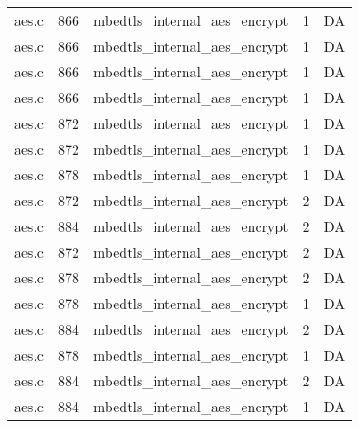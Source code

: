 \begin{table}
\begin{tabular}{clrrr}
aes.c& 866&mbedtls\_internal\_aes\_encrypt&1 &DA\\
aes.c& 866&mbedtls\_internal\_aes\_encrypt&1 &DA\\
aes.c& 866&mbedtls\_internal\_aes\_encrypt&1 &DA\\
aes.c& 866&mbedtls\_internal\_aes\_encrypt&1 &DA\\
aes.c& 872&mbedtls\_internal\_aes\_encrypt&1 &DA\\
aes.c& 872&mbedtls\_internal\_aes\_encrypt&1 &DA\\
aes.c& 878&mbedtls\_internal\_aes\_encrypt&1 &DA\\
aes.c& 872&mbedtls\_internal\_aes\_encrypt&2 &DA\\
aes.c& 884&mbedtls\_internal\_aes\_encrypt&2 &DA\\
aes.c& 872&mbedtls\_internal\_aes\_encrypt&2 &DA\\
aes.c& 878&mbedtls\_internal\_aes\_encrypt&2 &DA\\
aes.c& 878&mbedtls\_internal\_aes\_encrypt&1 &DA\\
aes.c& 884&mbedtls\_internal\_aes\_encrypt&2 &DA\\
aes.c& 878&mbedtls\_internal\_aes\_encrypt&1 &DA\\
aes.c& 884&mbedtls\_internal\_aes\_encrypt&2 &DA\\
aes.c& 884&mbedtls\_internal\_aes\_encrypt&1 &DA\\
\hline
\end{tabular}
\end{table}